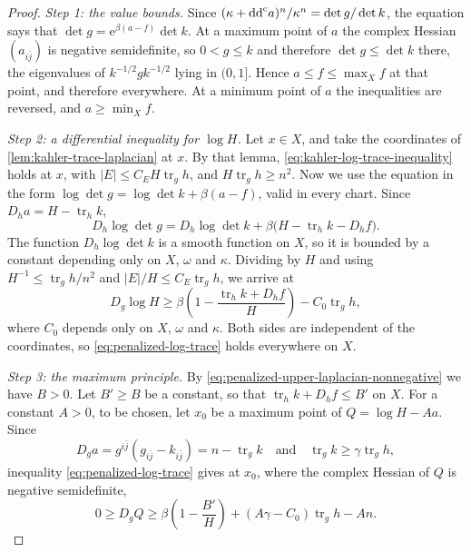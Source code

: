 \begin{proof}
\emph{Step 1: the value bounds.} Since $(\kappa+\mathrm{dd}^{\mathrm{c}} a)^n/\kappa^n=\det g/\det k$, the equation says that $\det g=\mathrm e^{\beta(a-f)}\det k$. At a maximum point of $a$ the complex Hessian $(a_{i\bar j})$ is negative semidefinite, so $0<g\leq k$ and therefore $\det g\leq\det k$ there, the eigenvalues of $k^{-1/2}gk^{-1/2}$ lying in $(0,1]$. Hence $a\leq f\leq\max_Xf$ at that point, and therefore everywhere. At a minimum point of $a$ the inequalities are reversed, and $a\geq\min_Xf$.

\emph{Step 2: a differential inequality for $\log H$.} Let $x\in X$, and take the coordinates of \cref{lem:kahler-trace-laplacian} at $x$. By that lemma, \eqref{eq:kahler-log-trace-inequality} holds at $x$, with $|E|\leq C_EH\operatorname{tr}_gh$, and $H\operatorname{tr}_gh\geq n^2$. Now we use the equation in the form $\log\det g=\log\det k+\beta(a-f)$, valid in every chart. Since $D_ha=H-\operatorname{tr}_hk$,
\[
 D_h\log\det g
 =D_h\log\det k+\beta\bigl(H-\operatorname{tr}_hk-D_hf\bigr).
\]
The function $D_h\log\det k$ is a smooth function on $X$, so it is bounded by a constant depending only on $X$, $\omega$ and $\kappa$. Dividing by $H$ and using $H^{-1}\leq\operatorname{tr}_gh/n^2$ and $|E|/H\leq C_E\operatorname{tr}_gh$, we arrive at
\begin{equation}\label{eq:penalized-log-trace}
 D_g\log H\geq\beta\left(1-\frac{\operatorname{tr}_h k+D_hf}{H}\right)
                                  -C_0\operatorname{tr}_g h,
\end{equation}
where $C_0$ depends only on $X$, $\omega$ and $\kappa$. Both sides are independent of the coordinates, so \eqref{eq:penalized-log-trace} holds everywhere on $X$.

\emph{Step 3: the maximum principle.} By \eqref{eq:penalized-upper-laplacian-nonnegative} we have $B>0$. Let $B'\geq B$ be a constant, so that $\operatorname{tr}_hk+D_hf\leq B'$ on $X$. For a constant $A>0$, to be chosen, let $x_0$ be a maximum point of $Q=\log H-Aa$. Since
\[
 D_ga=g^{i\bar j}(g_{i\bar j}-k_{i\bar j})=n-\operatorname{tr}_gk
 \quad\text{and}\quad
 \operatorname{tr}_gk\geq\gamma\operatorname{tr}_gh,
\]
inequality \eqref{eq:penalized-log-trace} gives at $x_0$, where the complex Hessian of $Q$ is negative semidefinite,
\begin{equation}\label{eq:penalized-trace-maximum}
 0\geq D_gQ\geq\beta\left(1-\frac{B'}H\right)
             +(A\gamma-C_0)\operatorname{tr}_g h-An.
\end{equation}


\end{proof}
